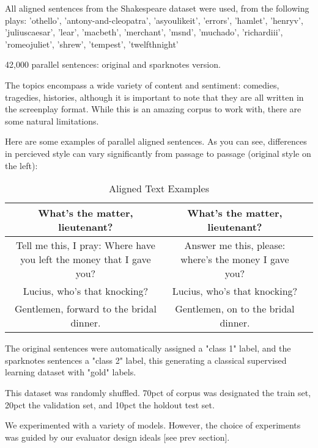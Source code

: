 \documentclass[letterpaper, 10 pt, conference]{ieeeconf}  %
\begin{document}
All aligned sentences from the Shakespeare dataset were used, from the following plays: 'othello', 'antony-and-cleopatra', 'asyoulikeit', 
                     'errors', 'hamlet', 'henryv', 'juliuscaesar', 'lear', 'macbeth', 
                     'merchant', 'msnd', 'muchado', 'richardiii', 'romeojuliet', 
                     'shrew', 'tempest', 'twelfthnight'

42,000 parallel sentences: original and sparknotes version.

The topics encompass a wide variety of content and sentiment: comedies, tragedies, histories, although it is important to note that they are all written in the screenplay format. While this is an amazing corpus to work with, there are some natural limitations.

Here are some examples of parallel aligned sentences. As you can see, differences in percieved style can vary significantly from passage to passage (original style on the left):


\begin{table}[h]
  \caption{Aligned Text Examples}
  \label{table_example}
  \begin{center}
    \begin{tabular}{| c | c | p{3cm} |}
    \hline
    What's the matter, lieutenant? & What's the matter, lieutenant?\\
    \hline
    Tell me this, I pray: Where have you left the money that I gave you? & Answer me this, please: where's the money I gave you?\\
    \hline
    Lucius, who's that knocking? & Lucius, who's that knocking?\\
    \hline
    Gentlemen, forward to the bridal dinner. & Gentlemen, on to the bridal dinner.\\
    \hline
    \end{tabular}
  \end{center}
\end{table}




The original sentences were automatically assigned a "class 1" label, and the sparknotes sentences a "class 2" label, this generating a classical supervised learning dataset with "gold" labels.

This dataset was randomly shuffled. 70pct of corpus was designated the train set, 20pct the validation set, and 10pct the holdout test set.
 
We experimented with a variety of models. However, the choice of experiments was guided by our evaluator design ideals [see prev section].
\end{document}
